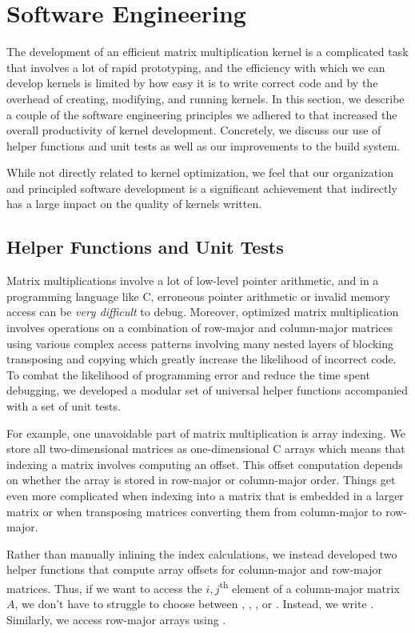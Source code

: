 \section{Software Engineering}\label{sec:sweng}
The development of an efficient matrix multiplication kernel is a complicated
task that involves a lot of rapid prototyping, and the efficiency with which we
can develop kernels is limited by how easy it is to write correct code and by
the overhead of creating, modifying, and running kernels. In this section, we
describe a couple of the software engineering principles we adhered to that
increased the overall productivity of kernel development. Concretely, we
discuss our use of helper functions and unit tests as well as our improvements
to the build system.

While not directly related to kernel optimization, we feel that our
organization and principled software development is a significant achievement
that indirectly has a large impact on the quality of kernels written.

\subsection{Helper Functions and Unit Tests}
Matrix multiplications involve a lot of low-level pointer arithmetic, and in a
programming language like C, erroneous pointer arithmetic or invalid memory
access can be \emph{very difficult} to debug. Moreover, optimized matrix multiplication
involves operations on a combination of row-major and column-major matrices
using various complex access patterns involving many nested layers of blocking
transposing and copying which greatly increase the likelihood of incorrect
code. To combat the likelihood of programming error and reduce the time spent
debugging, we developed a modular set of universal helper functions accompanied
with a set of unit tests.

For example, one unavoidable part of matrix multiplication is array indexing.
We store all two-dimensional matrices as one-dimensional C arrays which means
that indexing a matrix involves computing an offset. This offset computation
depends on whether the array is stored in row-major  or column-major order.
Things get even more complicated when indexing into a matrix that is embedded
in a larger matrix or when transposing matrices converting them from
column-major to row-major.

Rather than manually inlining the index calculations, we instead developed two
helper functions that compute array offsets for column-major and row-major
matrices. Thus, if we want to access the $i,j$\textsuperscript{th} element of a
column-major matrix $A$, we don't have to struggle to choose between , , , or . Instead, we
write . Similarly, we access row-major arrays using
.

